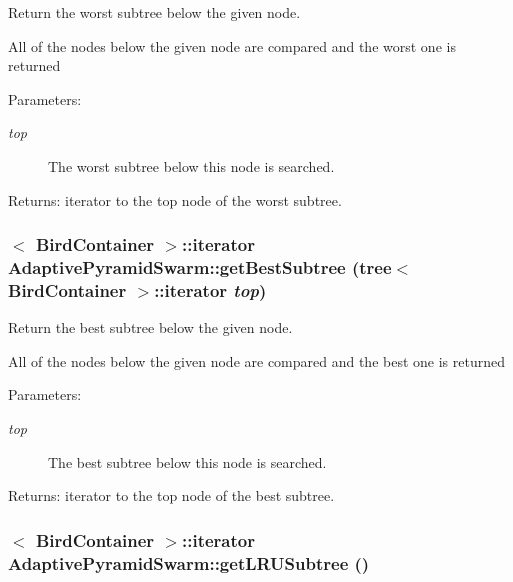 Return the worst subtree below the given node. 

All of the nodes below the given node are compared and the worst one is returned \begin{Desc}
\item[Parameters:]
\begin{description}
\item[{\em top}]The worst subtree below this node is searched. \end{description}
\end{Desc}
\begin{Desc}
\item[Returns:]iterator to the top node of the worst subtree. \end{Desc}
\hypertarget{classAdaptivePyramidSwarm_e37cf3ca7ce7c3b88f0309ff98cb3052}{
\subsubsection{$<$ {\bf BirdContainer} $>$::iterator AdaptivePyramidSwarm::getBestSubtree ({\bf tree}$<$ {\bf BirdContainer} $>$::iterator {\em top})}}
\label{classAdaptivePyramidSwarm_e37cf3ca7ce7c3b88f0309ff98cb3052}


Return the best subtree below the given node. 

All of the nodes below the given node are compared and the best one is returned \begin{Desc}
\item[Parameters:]
\begin{description}
\item[{\em top}]The best subtree below this node is searched. \end{description}
\end{Desc}
\begin{Desc}
\item[Returns:]iterator to the top node of the best subtree. \end{Desc}
\hypertarget{classAdaptivePyramidSwarm_a7d7026a1e51c961f105b748da828479}{
\subsubsection{$<$ {\bf BirdContainer} $>$::iterator AdaptivePyramidSwarm::getLRUSubtree ()}}
\label{classAdaptivePyramidSwarm_a7d7026a1e51c961f105b748da828479}


